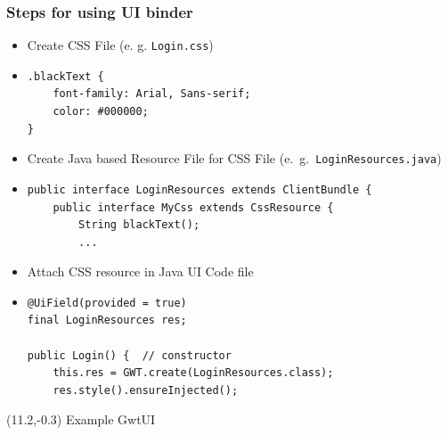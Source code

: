 \documentclass[10pt,table, xcolor=pdflatex]{beamer}
\begin{document}
\begin{frame}[fragile]\frametitle{Steps for using UI binder}
	\begin{itemize}
		\item Create CSS File (e. g. \texttt{Login.css})
        \item[] \begin{footnotesize} \begin{verbatim}
.blackText {
    font-family: Arial, Sans-serif;
    color: #000000;
}
\end{verbatim} \end{footnotesize}
		\item Create Java based Resource File for CSS File (e.~g.~\texttt{LoginResources.java})
        \item[] \lstset{language=Java, basicstyle=\footnotesize\ttfamily}
                \begin{lstlisting}
public interface LoginResources extends ClientBundle {
    public interface MyCss extends CssResource {
        String blackText();
        ...
\end{lstlisting}
		\item Attach CSS resource in Java UI Code file
        \item[] \lstset{language=Java, basicstyle=\footnotesize\ttfamily}
            \begin{lstlisting}
@UiField(provided = true)
final LoginResources res;

public Login() {  // constructor
    this.res = GWT.create(LoginResources.class);
    res.style().ensureInjected();
        \end{lstlisting}
	\end{itemize}
\begin{textblock}{15}(11.2,-0.3)
    {\footnotesize Example GwtUI}
\end{textblock}
\end{frame}
\end{document}

